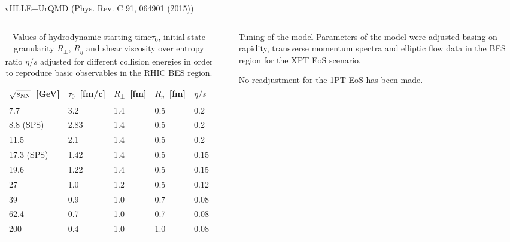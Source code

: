 \documentclass[final,hyperref={pdfpagelabels=false}, xcolor=dvipsnames]{beamer}
\begin{document}
\begin{frame}[shrink=30]
\begin{columns}[t]
\begin{block}{vHLLE+UrQMD (Phys. Rev. C 91, 064901 (2015))}
\begin{columns}[t]
   \begin{table}
  \caption{Values of hydrodynamic starting time$\tau_0$, initial state granularity $R_\perp$, $R_\eta$ and shear viscosity over entropy ratio $\eta/s$ 
adjusted for different collision energies in order to reproduce basic observables in the RHIC BES region.} 
\begin{tabular}{|l|l|l|l|l|}
\hline
 $\sqrt{s_{\rm NN}}$~[GeV] & $\tau_0$~[fm/c] & $R_\perp$~[fm] & $R_\eta$~[fm] & $\eta/s$ \\ \hline
     7.7          &      3.2        &     1.4        &     0.5    &    0.2   \\ \hline
     8.8 (SPS)    &      2.83       &     1.4        &     0.5    &    0.2   \\ \hline
     11.5         &      2.1        &     1.4        &     0.5    &    0.2   \\ \hline
     17.3 (SPS)   &      1.42       &     1.4        &     0.5    &    0.15  \\ \hline
     19.6         &      1.22       &     1.4        &     0.5    &    0.15  \\ \hline
     27           &      1.0        &     1.2        &     0.5    &    0.12  \\ \hline
     39           &      0.9        &     1.0        &     0.7    &    0.08  \\ \hline
     62.4         &      0.7        &     1.0        &     0.7    &    0.08  \\ \hline
     200          &      0.4        &     1.0        &     1.0    &    0.08  \\ \hline
 \end{tabular}
\end{table}  

\vskip 1.5cm 

\begin{block}{Tuning of the model}
Parameters of the model were adjusted basing on rapidity, transverse momentum spectra and elliptic flow data in the BES region for the XPT EoS scenario.

No readjustment for the 1PT EoS has been made.
\end{block}
      

\end{columns}
\end{block}
\end{columns}
\end{frame}
\end{document}
